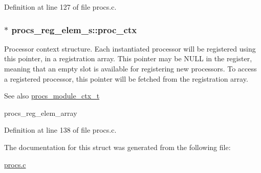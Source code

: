Definition at line 127 of file procs.\+c.

\subsubsection[{\texorpdfstring{proc\+\_\+ctx}{proc_ctx}}]{$\ast$ procs\+\_\+reg\+\_\+elem\+\_\+s\+::proc\+\_\+ctx}\hypertarget{structprocs__reg__elem__s_aa394ff40393e8ca08c8f4c9b0c965698}{}\label{structprocs__reg__elem__s_aa394ff40393e8ca08c8f4c9b0c965698}
Processor context structure. Each instantiated processor will be registered using this pointer, in a registration array. This pointer may be N\+U\+LL in the register, meaning that an empty slot is available for registering new processors. To access a registered processor, this pointer will be fetched from the registration array. \begin{DoxySeeAlso}{See also}
\hyperlink{procs_8c_ad411ade07d8515e93bc2e7abf2b1e765}{procs\+\_\+module\+\_\+ctx\+\_\+t} 

procs\+\_\+reg\+\_\+elem\+\_\+array 
\end{DoxySeeAlso}


Definition at line 138 of file procs.\+c.



The documentation for this struct was generated from the following file\+:\begin{DoxyCompactItemize}
\item 
\hyperlink{procs_8c}{procs.\+c}\end{DoxyCompactItemize}
